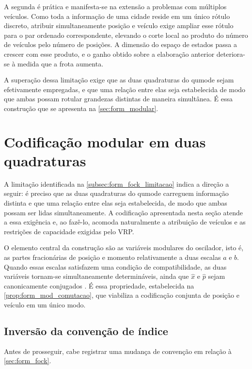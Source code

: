         A segunda é prática e manifesta-se na extensão a problemas com múltiplos veículos. Como toda a informação de uma cidade reside em um único rótulo discreto, atribuir simultaneamente posição e veículo exige ampliar esse rótulo para o par ordenado correspondente, elevando o corte local ao produto do número de veículos pelo número de posições. A dimensão do espaço de estados passa a crescer com esse produto, e o ganho obtido sobre a elaboração anterior deteriora-se à medida que a frota aumenta.

        A superação dessa limitação exige que as duas quadraturas do qumode sejam efetivamente empregadas, e que uma relação entre elas seja estabelecida de modo que ambas possam rotular grandezas distintas de maneira simultânea. É essa construção que se apresenta na \autoref{sec:form_modular}.


\section{Codificação modular em duas quadraturas}\label{sec:form_modular}

    A limitação identificada na \autoref{subsec:form_fock_limitacao} indica a direção a seguir: é preciso que as duas quadraturas do qumode carreguem informação distinta e que uma relação entre elas seja estabelecida, de modo que ambas possam ser lidas simultaneamente. A codificação apresentada nesta seção atende a essa exigência e, ao fazê-lo, acomoda naturalmente a atribuição de veículos e as restrições de capacidade exigidas pelo VRP.

    O elemento central da construção são as variáveis modulares do oscilador, isto é, as partes fracionárias de posição e momento relativamente a duas escalas $a$ e $b$. Quando essas escalas satisfazem uma condição de compatibilidade, as duas variáveis tornam-se simultaneamente determináveis, ainda que $\hat{x}$ e $\hat{p}$ sejam canonicamente conjugados \cite{?}. É essa propriedade, estabelecida na \autoref{prop:form_mod_comutacao}, que viabiliza a codificação conjunta de posição e veículo em um único modo.

    \subsection{Inversão da convenção de índice}\label{subsec:form_mod_convencao}

        Antes de prosseguir, cabe registrar uma mudança de convenção em relação à \autoref{sec:form_fock}.

